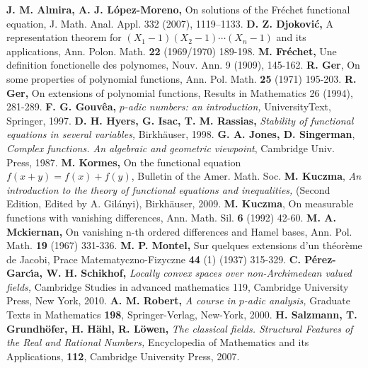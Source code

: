 \documentclass[12pt,a4paper]{amsart}
\theoremstyle{definition}
\begin{document}
 

\begin{thebibliography}{38}
 \textbf{J. M. Almira, A. J.  L\'{o}pez-Moreno, } On solutions of the Fr\'{e}chet functional equation, J. Math. Anal. Appl.  332 (2007), 1119--1133.
 \textbf{D. Z. Djokovi\'{c}, } A representation theorem for $(X_1-1)(X_2-1)\cdots(X_n-1)$ and its applications, Ann. Polon. Math. \textbf{22} (1969/1970) 189-198.
 \textbf{M. Fr\'{e}chet, }   Une definition fonctionelle des polynomes,
Nouv. Ann. 9 (1909), 145-162.
  \textbf{R. Ger}, On some properties of polynomial functions,
Ann. Pol. Math. \textbf{25 }(1971) 195-203.
 \textbf{R. Ger, } On extensions of polynomial functions, Results in
Mathematics 26 (1994), 281-289.
  \textbf{F. G. Gouv\^{e}a, } \textit{$p$-adic numbers: an introduction, } UniversityText, Springer, 1997.
 \textbf{D. H. Hyers, G. Isac, T. M. Rassias, } \textit{Stability of functional equations in several variables, } Birkh\"{a}user, 1998. 
 \textbf{G. A. Jones, D. Singerman}, \textit{Complex functions. An algebraic and geometric viewpoint}, Cambridge Univ. Press, 1987. 
 \textbf{M. Kormes, } On the functional equation $f(x+y)=f(x)+f(y)$, Bulletin of the Amer. Math. Soc. 
 \textbf{M. Kuczma}, \textit{An introduction to the theory of functional equations and inequalities, } (Second Edition, Edited by A. Gil\'{a}nyi), Birkh\"{a}user, 2009.
 \textbf{M. Kuczma}, On measurable functions with
vanishing differences, Ann. Math. Sil. \textbf{6} (1992) 42-60.
  \textbf{M. A. Mckiernan, }On vanishing n-th ordered
differences and Hamel bases, Ann. Pol. Math. \textbf{19} (1967) 331-336.
 \textbf{M. P. Montel, } Sur quelques extensions d'un th\'{e}or\`{e}me de Jacobi, Prace Matematyczno-Fizyczne \textbf{44} (1) (1937) 315-329.
 \textbf{C. P\'{e}rez-Garc\'{\i}a, W. H. Schikhof, } \textit{Locally convex spaces over non-Archimedean valued fields, } Cambridge Studies in advanced mathematics 119, Cambridge University Press, New York, 2010.
 \textbf{A. M. Robert, } \textit{A course in $p$-adic analysis, } Graduate Texts in Mathematics \textbf{198}, Springer-Verlag, New-York, 2000.
 \textbf{H. Salzmann, T. Grundh\"{o}fer, H. H\"{a}hl, R. L\"{o}wen, } \textit{The classical fields. Structural Features of the Real and Rational Numbers, } Encyclopedia of Mathematics and its Applications, \textbf{112}, Cambridge University Press, 2007.
\end{thebibliography}
\end{document}
